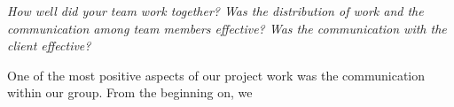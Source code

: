 \emph{How well did your team work together?
Was the distribution of work and the communication among team members effective?
Was the communication with the client effective?}

One of the most positive aspects of our project work was the communication within our group.
From the beginning on, we
